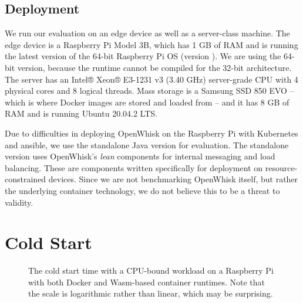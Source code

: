 \subsection{Deployment}

We run our evaluation on an edge device as well as a  server-class machine. The edge device is a Raspberry Pi Model 3B, which has 1 GB of RAM and is running the latest version of the 64-bit Raspberry Pi OS (version ). We are using the 64-bit version, because the  runtime cannot be compiled for the 32-bit  architecture. The server has an Intel® Xeon® E3-1231 v3 (3.40 GHz) server-grade CPU with 4 physical cores and 8 logical threads. Mass storage is a Samsung SSD 850 EVO -- which is where Docker images are stored and loaded from -- and it has 8 GB of RAM and is running Ubuntu 20.04.2 LTS.

Due to difficulties in deploying OpenWhisk on the Raspberry Pi with Kubernetes and ansible, we use the standalone Java version for evaluation. The standalone version uses OpenWhisk's \emph{lean} components for internal messaging and load balancing. These are components written specifically for deployment on resource-constrained devices. Since we are not benchmarking OpenWhisk itself, but rather the underlying container technology, we do not believe this to be a threat to validity.

\section{Cold Start}

\begin{figure}
    \begin{center}
        
    \end{center}
    \caption{The cold start time with a CPU-bound workload on a Raspberry Pi with both Docker and Wasm-based container runtimes. Note that the scale is logarithmic rather than linear, which may be surprising.}
    \label{fig:pi-cold-start-hash}
\end{figure}

